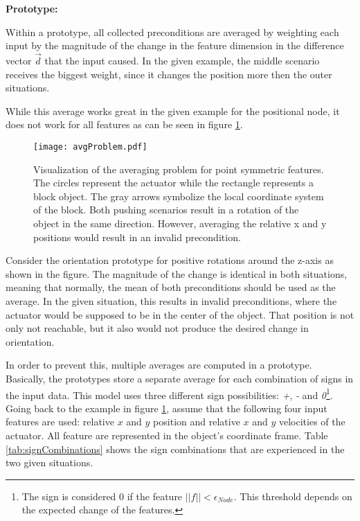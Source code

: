 \textbf{Prototype:}

Within a prototype, all collected preconditions are averaged by weighting each input by the magnitude of the change in the feature dimension in the difference vector $\vec{d}$ that the input caused.
In the given example, the middle scenario receives the biggest weight, since it changes the position more then the outer situations. 

While this average works great in the given example for the positional node, it does not work for all features as can be seen in figure \ref{fig:avgProblem}.

\begin{figure}
	\centering
	\texttt{[image: avgProblem.pdf]}
	\caption{Visualization of the averaging problem for point symmetric features. The circles represent the actuator while the rectangle represents a block object. The gray arrows symbolize the local coordinate system of the block. Both pushing scenarios result in a rotation of the object in the same direction. However, averaging the relative x and y positions would result in an invalid precondition.} 
	\label{fig:avgProblem}
\end{figure} %

Consider the orientation prototype for positive rotations around the z-axis as shown in the figure. The magnitude of the change is identical in both situations, meaning that normally, the mean of both preconditions should be used as the average. In the given situation, this results in invalid preconditions, where the actuator would be supposed to be in the center of the object. That position is not only not reachable, but it also would not produce the desired change in orientation. 

In order to prevent this, multiple averages are computed in a prototype. Basically, the prototypes store a separate average for each combination of signs in the input data. This model uses three different sign possibilities: \textit{+}, \textit{-} and \textit{0}\footnote{The sign is considered 0 if the feature $||f|| < \epsilon_{Node}$. This threshold depends on the expected change of the features.}.
Going back to the example in figure \ref{fig:avgProblem}, assume that the following four input features are used: relative $x$ and $y$ position and relative $x$ and $y$ velocities of the actuator. All feature are represented in the object's coordinate frame. Table \ref{tab:signCombinations} shows the sign combinations that are experienced in the two given situations. 

